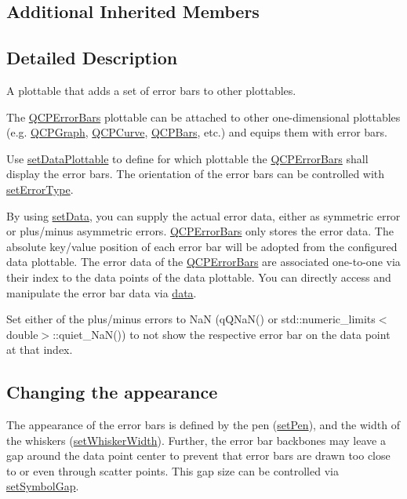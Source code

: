 \subsection*{Additional Inherited Members}


\subsection{Detailed Description}
A plottable that adds a set of error bars to other plottables. 



The \hyperlink{class_q_c_p_error_bars}{Q\+C\+P\+Error\+Bars} plottable can be attached to other one-\/dimensional plottables (e.\+g. \hyperlink{class_q_c_p_graph}{Q\+C\+P\+Graph}, \hyperlink{class_q_c_p_curve}{Q\+C\+P\+Curve}, \hyperlink{class_q_c_p_bars}{Q\+C\+P\+Bars}, etc.) and equips them with error bars.

Use \hyperlink{class_q_c_p_error_bars_aabb42a964cfbf780cd1c79850c7cd989}{set\+Data\+Plottable} to define for which plottable the \hyperlink{class_q_c_p_error_bars}{Q\+C\+P\+Error\+Bars} shall display the error bars. The orientation of the error bars can be controlled with \hyperlink{class_q_c_p_error_bars_af0af493d454a8f3a0908830160680d2b}{set\+Error\+Type}.

By using \hyperlink{class_q_c_p_error_bars_a92b1980003255f5f7c05407a4d92aabc}{set\+Data}, you can supply the actual error data, either as symmetric error or plus/minus asymmetric errors. \hyperlink{class_q_c_p_error_bars}{Q\+C\+P\+Error\+Bars} only stores the error data. The absolute key/value position of each error bar will be adopted from the configured data plottable. The error data of the \hyperlink{class_q_c_p_error_bars}{Q\+C\+P\+Error\+Bars} are associated one-\/to-\/one via their index to the data points of the data plottable. You can directly access and manipulate the error bar data via \hyperlink{class_q_c_p_error_bars_ade69711ef3f9ec10e77d121fa2ba773b}{data}.

Set either of the plus/minus errors to NaN ({\ttfamily q\+Q\+Na\+N()} or {\ttfamily std\+::numeric\+\_\+limits$<$double$>$\+::quiet\+\_\+\+Na\+N()}) to not show the respective error bar on the data point at that index.\hypertarget{class_q_c_p_error_bars_qcperrorbars-appearance}{}\subsection{Changing the appearance}\label{class_q_c_p_error_bars_qcperrorbars-appearance}
The appearance of the error bars is defined by the pen (\hyperlink{class_q_c_p_abstract_plottable_ab74b09ae4c0e7e13142fe4b5bf46cac7}{set\+Pen}), and the width of the whiskers (\hyperlink{class_q_c_p_error_bars_ad05f6ff9e46c6047f1cd2459744b7b59}{set\+Whisker\+Width}). Further, the error bar backbones may leave a gap around the data point center to prevent that error bars are drawn too close to or even through scatter points. This gap size can be controlled via \hyperlink{class_q_c_p_error_bars_a280ee8d863d8a2630c309701d019b3de}{set\+Symbol\+Gap}. 

